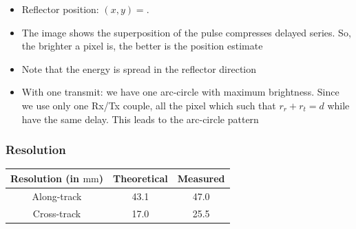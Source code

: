 \documentclass[UKenglish,8pt,aspectratio=1610]{beamer}
\begin{document}
\begin{frame}
\begin{itemize}
	\item Reflector position: $(x,y)=$. 
	\item The image shows the superposition of the pulse compresses delayed series. So, the brighter a pixel is, the better is the position estimate
	\item Note that the energy is spread in the reflector direction
	\item With one transmit: we have one arc-circle with maximum brightness. Since we use only one Rx/Tx couple, all the pixel which such that $r_r + r_t = d$ while have the same delay. This leads to the arc-circle pattern
\end{itemize}
\end{frame}

\begin{frame}
	\frametitle{Resolution}
\begin{tabular}{ccc}
	\hline
	Resolution (in $\si{\milli\meter}$)&Theoretical&Measured\\
	\hline
	\hline
	Along-track&43.1&47.0  \\
	Cross-track&17.0&25.5\\
	\hline
\end{tabular}
\end{frame}
\end{document}
